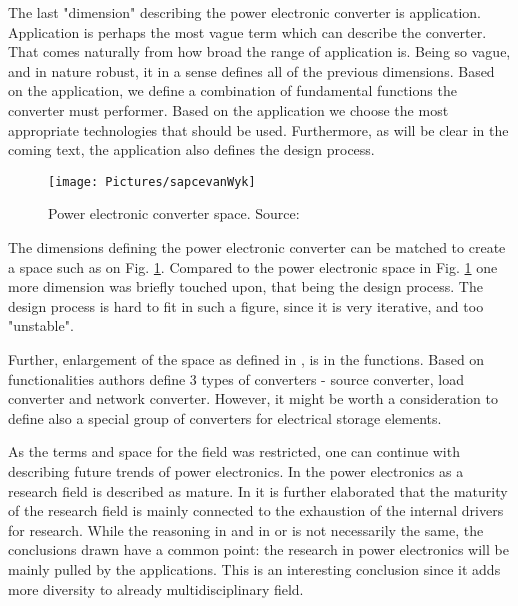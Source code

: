 \documentclass[]{scrartcl}
\begin{document}

The last "dimension" describing the power electronic converter is application. Application is perhaps the most vague term which can describe the converter. That comes naturally from how broad the range of application is. Being so vague, and in nature robust, it in a sense defines all of the previous dimensions. Based on the application, we define a combination of fundamental functions the converter must performer. Based on the application we choose the most appropriate technologies that should be used. Furthermore, as will be clear in the coming text, the application also defines the design process. 

\begin{figure}[h!]
\centering
\texttt{[image: Pictures/sapcevanWyk]}
\caption{Power electronic converter space. Source:\cite{VanWyk2014}}
\label{fig:sapcevanwyk}
\end{figure}


The dimensions defining the power electronic converter can be matched to create a space such as on Fig. \ref{fig:sapcevanwyk}. Compared to the power electronic space in Fig. \ref{fig:sapcevanwyk} one more dimension was briefly touched upon, that being the design process. The design process is hard to fit in such a figure, since it is very iterative, and too "unstable".

 Further, enlargement of the space as defined in \cite{VanWyk2013}, is in the functions. Based on functionalities authors define 3 types of converters - source converter, load converter and network converter. However, it might be worth a consideration to define also a special group of converters for electrical storage elements.
 
 

As the terms and space for the field was restricted, one can continue with describing future trends of power electronics. In \cite{Kolar2010} the power electronics as a research field is described as mature. In \cite{VanWyk2013} it is further elaborated that the maturity of the research field is mainly connected to the exhaustion of the internal drivers for research. While the reasoning in \cite{Kolar2010} and in \cite{Wyk2012} or \cite{Boroyevich2013} is not necessarily the same, the conclusions drawn have a common point: the research in power electronics will be mainly pulled by the applications. This is an interesting conclusion since it adds more diversity to already multidisciplinary field. 
\end{document}
